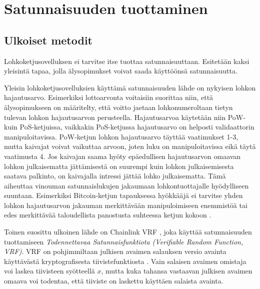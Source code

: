 \chapter{Satunnaisuuden tuottaminen\label{results}}

\section{Ulkoiset metodit}

Lohkoketjusovelluksen ei tarvitse itse tuottaa satunnaisuuttaan. Esitetään kaksi yleisintä tapaa, jolla älysopimukset voivat saada käyttöönsä satunnaisuutta.

Yleisin lohkoketjusovelluksien käyttämä satunnaisuuden lähde on nykyisen lohkon hajautusarvo. Esimerkiksi lottoarvonta voitaisiin suorittaa niin, että älysopimukseen on määritelty, että voitto jaetaan lohkonumeroltaan tietyn tulevan lohkon hajautusarvon perusteella. Hajautusarvoa käytetään niin PoW- kuin PoS-ketjuissa, vaikkakin PoS-ketjussa hajautusarvo on helposti validaattorin manipuloitavissa. PoW-ketjun lohkon hajautusarvo täyttää vaatimukset 1-3, mutta kaivajat voivat vaikuttaa arvoon, joten luku on manipuloitavissa eikä täytä vaatimusta 4. Jos kaivajan saama hyöty epäedullisen hajautusarvon omaavan lohkon julkaisematta jättämisestä on suurempi kuin lohkon julkaisemisesta saatava palkinto, on kaivajalla intressi jättää lohko julkaisematta. Tämä aiheuttaa vinouman satunnaislukujen jakaumaan lohkontuottajalle hyödylliseen suuntaan. Esimerkiksi Bitcoin-ketjun tapauksessa hyökkääjä ei tarvitse yhden lohkon hajautusarvon jakauman merkittävään manipuloimiseen enemmistöä tai edes merkittävää taloudellista panostusta suhteessa ketjun kokoon \cite{pierrot_malleability_2018}.

Toinen suosittu ulkoinen lähde on Chainlink VRF \cite{noauthor_verifiable_2020}, joka käyttää satunnaisuuden tuottamiseen \textit{Todennettavaa Satunnaisfunktiota (Verifiable Random Function, VRF)}. VRF \cite{micali_verifiable_1999} on pohjimmiltaan julkisen avaimen salauksen versio avainta käyttävästä kryptografisesta tiivistefunktiosta \cite{papadopoulos2017making}. Vain salaisen avaimen omistaja voi laskea tiivisteen syötteellä $x$, mutta kuka tahansa vastaavan julkisen avaimen omaava voi todentaa, että tiiviste on laskettu käyttäen salaista avainta.


